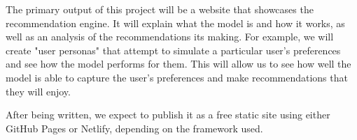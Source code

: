 \documentclass{./styles/ucsdreport}
\begin{document}
The primary output of this project will be a website that showcases the recommendation engine. It will explain what the model is and how it works, as well as an analysis of the recommendations its making. For example, we will create "user personas" that attempt to simulate a particular user's preferences and see how the model performs for them. This will allow us to see how well the model is able to capture the user's preferences and make recommendations that they will enjoy.

After being written, we expect to publish it as a free static site using either GitHub Pages or Netlify, depending on the framework used.




\end{document}
